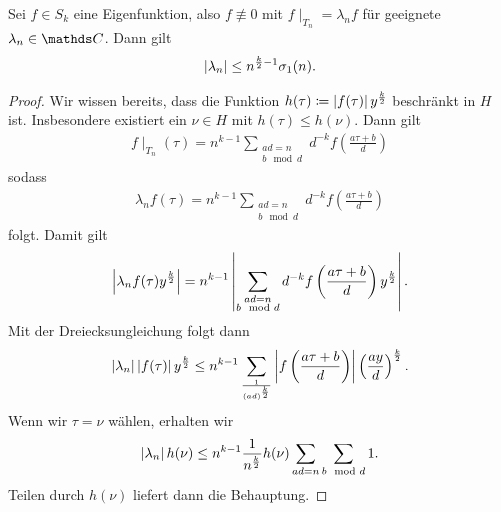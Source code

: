 \begin{prop}
Sei $f\in S_k$ eine Eigenfunktion, also $f\not \equiv 0$ mit $f\mid_{T_n}=\lambda_n f$ für geeignete $\lambda_n \in \C$.
Dann gilt
\begin{align*}
\left\vert\lambda_n\right\vert\leq n^{\frac{k}{2}-1}\sigma_1(n).
\end{align*}
\end{prop}
\begin{proof}
Wir wissen bereits, dass die Funktion $h(\tau)\coloneqq \left\vert f(\tau)\right\vert y^{\frac{k}{2}}$ beschränkt in $H$ ist.
Insbesondere existiert ein $\nu \in H$ mit $h(\tau)\leq h(\nu)$.
Dann gilt
\begin{align*}
f\mid_{T_n}(\tau)=n^{k-1} \sum_{\substack{ad=n \\ b \mod d}}d^{-k} f\left(\frac{a\tau+b}{d}\right)
\end{align*}
sodass
\begin{align*}
\lambda_n f(\tau)=n^{k-1} \sum_{\substack{ad=n \\ b \mod d}}d^{-k} f\left(\frac{a\tau+b}{d}\right)
\end{align*}
folgt.
Damit gilt
\begin{align*}
\left\vert\lambda_n f(\tau)y^{\frac{k}{2}}\right\vert =n^{k-1} \left\vert\sum_{\substack{ad=n \\ b \mod d}}d^{-k} f\left(\frac{a\tau+b}{d}\right) y^{\frac{k}{2}}\right\vert.
\end{align*}
Mit der Dreiecksungleichung folgt dann
\begin{align*}
\left\vert\lambda_n\right\vert \left\vert f(\tau)\right\vert y^{\frac{k}{2}} \leq n^{k-1} \sum_{\frac{1}{(ad)^{\frac{k}{2}}}} \left\vert f\left(\frac{a\tau+b}{d}\right)\right\vert \left(\frac{ay}{d}\right)^{\frac{k}{2}}.
\end{align*}
Wenn wir $\tau=\nu$ wählen, erhalten wir
\begin{align*}
\left\vert\lambda_n\right\vert h(\nu)\leq n^{k-1} \frac{1}{n^{\frac{k}{2}}} h(\nu) \sum_{ad=n} \sum_{b\mod d} 1.
\end{align*}
Teilen durch $h(\nu)$ liefert dann die Behauptung.
\end{proof}


